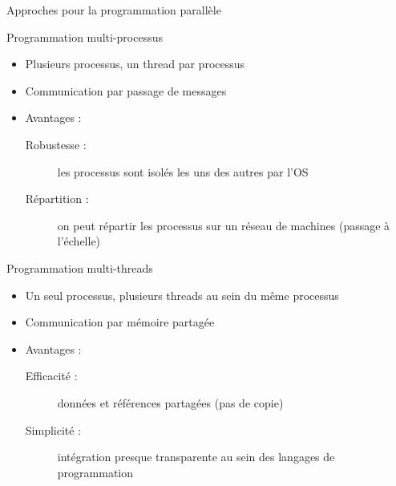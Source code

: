 \begin{frame} {Approches pour la programmation parallèle}
    \begin{exampleblock}{Programmation multi-processus}
       \begin{itemize}
         \item Plusieurs processus, un thread par processus
         \item Communication par passage de messages
         \item Avantages : 
       \begin{description}
         \item [Robustesse :] les processus sont isolés les uns des autres par l'OS
         \item [Répartition :] on peut répartir les processus sur un réseau de machines (passage à l'échelle)
       \end{description}
       \end{itemize}
     \end{exampleblock}
        
    \vfill
    \begin{exampleblock}{Programmation multi-threads}
       \begin{itemize}
         \item Un seul processus, plusieurs threads au sein du même processus
         \item Communication par mémoire partagée
         \item Avantages : 
        \begin{description}
        \item [Efficacité :] données et références partagées (pas de copie) %
        \item [Simplicité :] intégration presque transparente au sein des langages de programmation %
        \end{description}
       \end{itemize}
    \end{exampleblock}
\end{frame}

